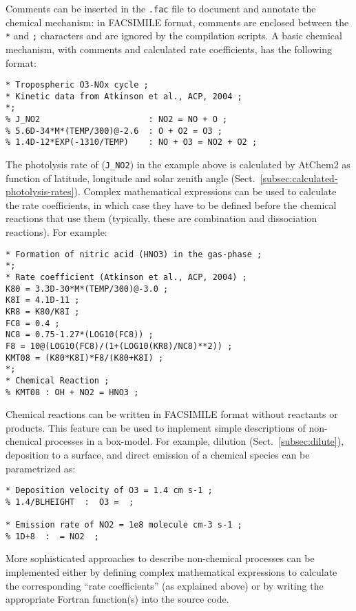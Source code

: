 Comments can be inserted in the \texttt{.fac} file to document and
annotate the chemical mechanism: in FACSIMILE format, comments are
enclosed between the \texttt{*} and \texttt{;} characters and are
ignored by the compilation scripts. A basic chemical mechanism, with
comments and calculated rate coefficients, has the following format:

\begin{verbatim}
* Tropospheric O3-NOx cycle ;
* Kinetic data from Atkinson et al., ACP, 2004 ;
*;
% J_NO2                      : NO2 = NO + O ;
% 5.6D-34*M*(TEMP/300)@-2.6  : O + O2 = O3 ;
% 1.4D-12*EXP(-1310/TEMP)    : NO + O3 = NO2 + O2 ;
\end{verbatim}

The photolysis rate of  (\texttt{J\_NO2}) in the example above
is calculated by AtChem2 as function of latitude, longitude and solar
zenith angle (Sect.~\ref{subsec:calculated-photolysis-rates}).
Complex mathematical expressions can be used to calculate the rate
coefficients, in which case they have to be defined before the
chemical reactions that use them (typically, these are combination and
dissociation reactions). For example:

\begin{verbatim}
* Formation of nitric acid (HNO3) in the gas-phase ;
*;
* Rate coefficient (Atkinson et al., ACP, 2004) ;
K80 = 3.3D-30*M*(TEMP/300)@-3.0 ;
K8I = 4.1D-11 ;
KR8 = K80/K8I ;
FC8 = 0.4 ;
NC8 = 0.75-1.27*(LOG10(FC8)) ;
F8 = 10@(LOG10(FC8)/(1+(LOG10(KR8)/NC8)**2)) ;
KMT08 = (K80*K8I)*F8/(K80+K8I) ;
*;
* Chemical Reaction ;
% KMT08 : OH + NO2 = HNO3 ;
\end{verbatim}

Chemical reactions can be written in FACSIMILE format without
reactants or products. This feature can be used to implement simple
descriptions of non-chemical processes in a box-model. For example,
dilution (Sect.~\ref{subsec:dilute}), deposition to a surface, and
direct emission of a chemical species can be parametrized as:

\begin{verbatim}
* Deposition velocity of O3 = 1.4 cm s-1 ;
% 1.4/BLHEIGHT  :  O3 =  ;

* Emission rate of NO2 = 1e8 molecule cm-3 s-1 ;
% 1D+8  :  = NO2  ;
\end{verbatim}

More sophisticated approaches to describe non-chemical processes can
be implemented either by defining complex mathematical expressions to
calculate the corresponding ``rate coefficients'' (as explained above)
or by writing the appropriate Fortran function(s) into the source
code.

